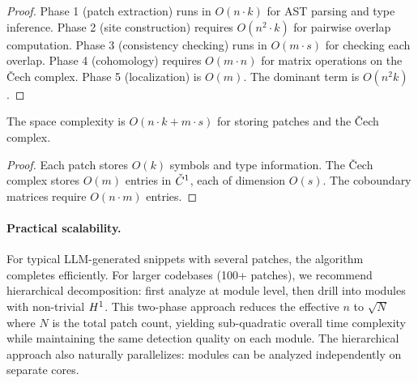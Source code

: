 \documentclass[11pt]{article}
\begin{document}
\begin{proof}
Phase 1 (patch extraction) runs in $O(n \cdot k)$ for AST parsing
and type inference.  Phase 2 (site construction) requires $O(n^2 \cdot k)$
for pairwise overlap computation.  Phase 3 (consistency checking)
runs in $O(m \cdot s)$ for checking each overlap.  Phase 4 (cohomology)
requires $O(m \cdot n)$ for matrix operations on the \v{C}ech complex.
Phase 5 (localization) is $O(m)$.  The dominant term is $O(n^2 k)$.
\end{proof}

\begin{proposition}\label{prop:space}
The space complexity is $O(n \cdot k + m \cdot s)$ for storing
patches and the \v{C}ech complex.
\end{proposition}

\begin{proof}
Each patch stores $O(k)$ symbols and type information.  The \v{C}ech
complex stores $O(m)$ entries in $\check{C}^1$, each of dimension $O(s)$.
The coboundary matrices require $O(n \cdot m)$ entries.
\end{proof}

\paragraph{Practical scalability.}
For typical LLM-generated snippets with several patches,
the algorithm completes efficiently.  For
larger codebases (100+ patches), we recommend hierarchical decomposition:
first analyze at module level, then drill into modules with non-trivial
$H^{1}$.  This two-phase approach reduces the effective $n$ to
$\sqrt{N}$ where $N$ is the total patch count, yielding sub-quadratic
overall time complexity while maintaining the same detection quality
on each module.  The hierarchical approach also naturally parallelizes:
modules can be analyzed independently on separate cores.
\end{document}
